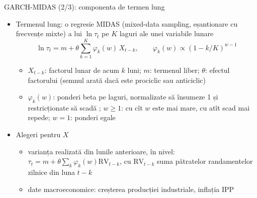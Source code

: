 \begin{frame}{GARCH-MIDAS (2/3): componenta de termen lung}
\itemsize{\small}
\begin{itemize}
    \item Termenul lung: o regresie MIDAS (mixed-data sampling, eșantionare cu frecvențe mixte) a lui $\ln\tau_t$ pe $K$ laguri ale unei variabile lunare
    \[ \ln\tau_t = m + \theta\sum_{k=1}^K\varphi_k(w)\,X_{t-k}, \qquad \varphi_k(w) \propto (1 - k/K)^{w - 1} \]
    \begin{itemize}
        \item $X_{t-k}$: factorul lunar de acum $k$ luni; $m$: termenul liber; $\theta$: efectul factorului (semnul arată dacă este prociclic sau anticiclic)
        \item $\varphi_k(w)$: ponderi beta pe laguri, normalizate să însumeze 1 și restricționate să scadă ; $w \ge 1$: cu cît $w$ este mai mare, cu atît scad mai repede; $w = 1$: ponderi egale
    \end{itemize}
    \item Alegeri pentru $X$
    \begin{itemize}
        \item varianța realizată din lunile anterioare, în nivel: $\tau_t = m + \theta\sum_k\varphi_k(w)\mathrm{RV}_{t-k}$, cu $\mathrm{RV}_{t-k}$ suma pătratelor randamentelor zilnice din luna $t-k$
        \item date macroeconomice: creșterea producției industriale, inflația IPP
    \end{itemize}
\end{itemize}
\end{frame}

